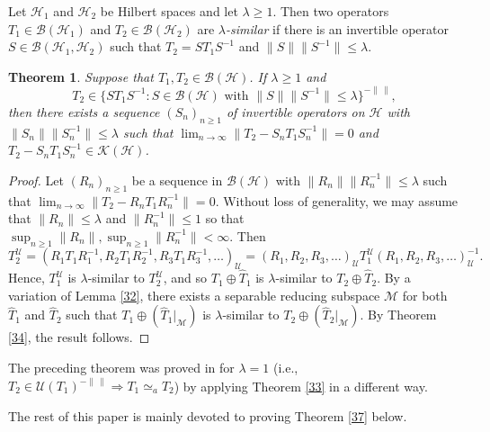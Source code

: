 \documentclass[11pt]{amsart}
\newtheorem{theorem}{Theorem}[section]
\theoremstyle{definition}
\numberwithin{equation}{section}
\begin{document}
Let $\mathcal{H}_{1}$ and $\mathcal{H}_{2}$ be Hilbert spaces and let $\lambda\geq 1$. Then two operators $T_{1}\in\mathcal{B}(\mathcal{H}_{1})$ and $T_{2}\in\mathcal{B}(
\mathcal{H}_{2})$ are {\it $\lambda$-similar} if there is an invertible operator $S\in\mathcal{B}(\mathcal{H}_{1},\mathcal{H}_{2})$ such that $T_{2}=ST_{1}S^{-1}$ and
$\|S\|\|S^{-1}\|\leq\lambda$.
\begin{theorem}\label{36}
Suppose that $T_{1},T_{2}\in\mathcal{B(H)}$. If $\lambda\geq 1$ and
\[T_{2}\in\{ST_{1}S^{-1}:S\in\mathcal{B(H)}\text{ with }\|S\|\|S^{-1}\|\leq\lambda\}^{-\|\,\|},\]
then there exists a sequence $(S_{n})_{n\geq 1}$ of invertible operators on $\mathcal{H}$ with $\|S_{n}\|\|S_{n}^{-1}\|\leq\lambda$ such that $\displaystyle\lim_{n\to
\infty}\|T_{2}-S_{n}T_{1}S_{n}^{-1}\|=0$ and $T_{2}-S_{n}T_{1}S_{n}^{-1}\in\mathcal{K(H)}$.
\end{theorem}
\begin{proof}
Let $(R_{n})_{n\geq 1}$ be a sequence in $\mathcal{B(H)}$ with $\|R_{n}\|\|R_{n}^{-1}\|\leq\lambda$ such that $\displaystyle\lim_{n\to\infty}\|T_{2}-R_{n}T_{1}R_{n}^{-1}\|
=0$. Without loss of generality, we may assume that $\|R_{n}\|\leq\lambda$ and $\|R_{n}^{-1}\|\leq 1$ so that $\displaystyle\sup_{n\geq 1}\|R_{n}\|,\sup_{n\geq 1}\|R_{n}^{
-1}\|<\infty$. Then
\[T_{2}^{\mathscr{U}}=(R_{1}T_{1}R_{1}^{-1},R_{2}T_{1}R_{2}^{-1},R_{3}T_{1}R_{3}^{-1},\ldots)_{\mathscr{U}}=(R_{1},R_{2},R_{3},\ldots)_{\mathscr{U}}T_{1}^{\mathscr{U}}(R_{
1},R_{2},R_{3},\ldots)_{\mathscr{U}}^{-1}.\]
Hence, $T_{1}^{\mathscr{U}}$ is $\lambda$-similar to $T_{2}^{\mathscr{U}}$, and so $T_{1}\oplus\widehat{T}_{1}$ is $\lambda$-similar to $T_{2}\oplus\widehat{T}_{2}$. By a
variation of Lemma \ref{32}, there exists a separable reducing subspace $\mathcal{M}$ for both $\widehat{T}_{1}$ and $\widehat{T}_{2}$ such that $T_{1}\oplus(\widehat{T}_{
1}|_{\mathcal{M}})$
is $\lambda$-similar to $T_{2}\oplus(\widehat{T}_{2}|_{\mathcal{M}})$. By Theorem \ref{34}, the result follows.
\end{proof}
The preceding theorem was proved in \cite{Voiculescu} for $\lambda=1$ (i.e., $T_{2}\in\mathcal{U}(T_{1})^{-\|\,\|}\Rightarrow T_{1}\simeq_{a}T_{2}$) by applying Theorem \ref{33} in a different way.

The rest of this paper is mainly devoted to proving Theorem \ref{37} below.
\end{document}
